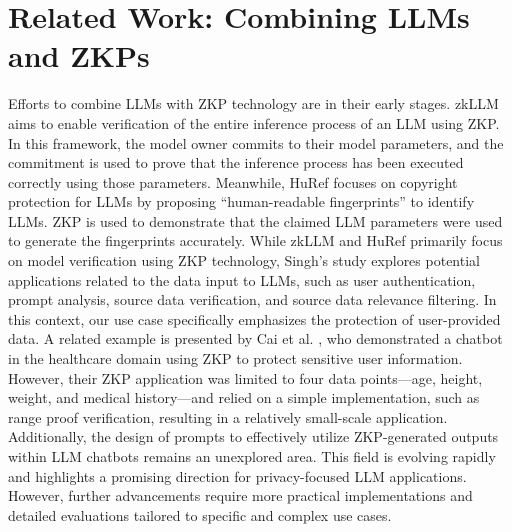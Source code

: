 \section{Related Work: Combining LLMs and ZKPs}
Efforts to combine LLMs with ZKP technology are in their early stages. zkLLM \cite{sun2024zkllm} aims to enable verification of the entire inference process of an LLM using ZKP. In this framework, the model owner commits to their model parameters, and the commitment is used to prove that the inference process has been executed correctly using those parameters. Meanwhile, HuRef \cite{zeng2024huref} focuses on copyright protection for LLMs by proposing “human-readable fingerprints” to identify LLMs. ZKP is used to demonstrate that the claimed LLM parameters were used to generate the fingerprints accurately. While zkLLM and HuRef primarily focus on model verification using ZKP technology, Singh’s study \cite{singh2024enhancing} explores potential applications related to the data input to LLMs, such as user authentication, prompt analysis, source data verification, and source data relevance filtering. In this context, our use case specifically emphasizes the protection of user-provided data. A related example is presented by Cai et al. \cite{Cai2023hcpp}, who demonstrated a chatbot in the healthcare domain using ZKP to protect sensitive user information. However, their ZKP application was limited to four data points—age, height, weight, and medical history—and relied on a simple implementation, such as range proof verification, resulting in a relatively small-scale application. Additionally, the design of prompts to effectively utilize ZKP-generated outputs within LLM chatbots remains an unexplored area. This field is evolving rapidly and highlights a promising direction for privacy-focused LLM applications. However, further advancements require more practical implementations and detailed evaluations tailored to specific and complex use cases.

